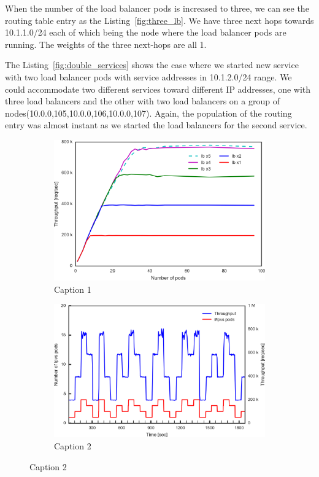 When the number of the load balancer pods is increased to three, we can see the routing table entry as the Listing~\ref{fig:three_lb}.
We have three next hops towards 10.1.1.0/24 each of which being the node where the load balancer pods are running.
The weights of the three next-hops are all 1.   

The Listing~\ref{fig:double_services} shows the case where we started new service with two load balancer pods with service addresses in 10.1.2.0/24 range.
We could accommodate two different services toward different IP addresses, one with three load balancers and the other with two load balancers on a group of nodes(10.0.0,105,10.0.0,106,10.0.0,107). 
Again, the population of the routing entry was almost instant as we started the load balancers for the second service.

\begin{figure}[tb]

  \begin{subfigure}[t]{\columnwidth}
    \includegraphics[width=0.9\columnwidth,left]{Figs/ecmp_lb_cubic_ieice}
    \caption{Caption 1}
    \label{fig:ecmp_lb_cubic_ieice}
  \end{subfigure}

  \par\bigskip

  \begin{subfigure}[t]{\columnwidth}
    \includegraphics[width=0.98\columnwidth,left]{Figs/ecmp_response_ieice}
    \caption{Caption 2}
    \label{fig:ecmp_response_ieice}
  \end{subfigure}


\end{figure}
